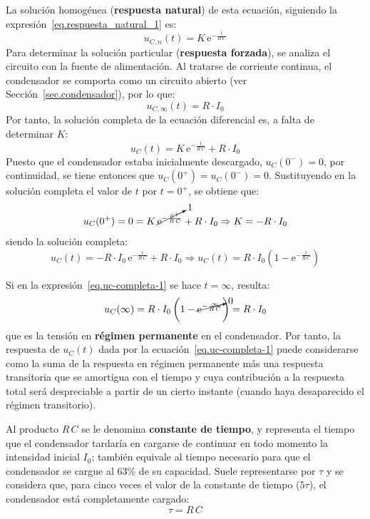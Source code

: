 	La solución homogénea (\textbf{respuesta natural}) de esta ecuación, siguiendo la expresión~\eqref{eq.respuesta_natural_1} es:
	\begin{equation}
	    \boxed{u_{C,n}(t)=K\,\mathrm{e}^{-\frac{t}{R\,C}}}
	\end{equation}
	Para determinar la solución particular (\textbf{respuesta forzada}), se analiza el circuito con la fuente de alimentación. Al tratarse de corriente continua, el condensador se comporta como un circuito abierto (ver Sección~\ref{sec.condensador}), por lo que:
	\begin{equation}
	    \boxed{u_{C,\infty}(t)=R\cdot I_0}
	\end{equation}
	Por tanto, la solución completa de la ecuación diferencial es, a falta de determinar $K$:
	\begin{equation*}{u_C(t)=K\,\mathrm{e}^{-\frac{t}{R\,C}}+R\cdot I_0}
	\end{equation*}
	Puesto que el condensador estaba inicialmente descargado,  $u_C(0^-)=0$, por continuidad, se tiene entonces que $u_C(0^+)=u_C(0^-)=0$. Sustituyendo en la solución completa el valor de $t$ por $t=0^+$, se obtiene que:
	\begin{equation*}
	    u_C(0^+)=0=K\,\cancelto{1}{\mathrm{e}^{-\frac{0^+}{R\,C}}}+R\cdot I_0\Rightarrow K=-R\cdot I_0
	\end{equation*}
	siendo la solución completa:
	\begin{equation}\label{eq.uc-completa-1}
	    u_C(t)=-R\cdot I_0\,\mathrm{e}^{-\frac{t}{R\,C}}+R\cdot I_0\Rightarrow \boxed{u_C(t) =R\cdot I_0\left(1- \mathrm{e}^{-\frac{t}{R\,C}}\right)}
	\end{equation}
	
	Si en la expresión~\eqref{eq.uc-completa-1} se hace $t=\infty$, resulta:
	\begin{equation*}
	    u_C(\infty)=R\cdot I_0\left(1- \cancelto{0}{\mathrm{e}^{-\frac{\infty}{R\,C}}}\right)=R\cdot I_0
	\end{equation*}
	que es la tensión en \textbf{régimen permanente} en el condensador. Por tanto, la respuesta de $u_C(t)$ dada por la ecuación~\eqref{eq.uc-completa-1} puede considerarse como la suma de la respuesta en régimen permanente más una respuesta transitoria que se amortigua con el tiempo y cuya contribución a la respuesta total será despreciable a partir de un cierto instante (cuando haya desaparecido el régimen transitorio). 
	
	Al producto $R\,C$ se le denomina \textbf{constante de tiempo}, y representa el tiempo que el condensador tardaría en cargarse de continuar en todo momento la intensidad inicial $I_0$; también equivale al tiempo necesario para que el condensador se cargue al 63\% de su capacidad. Suele representarse por $\tau$ y se considera que, para cinco veces el valor de la constante de tiempo ($5\tau$), el condensador está completamente cargado:
	\begin{equation}
	    \boxed{\tau=R\,C}
	\end{equation}

